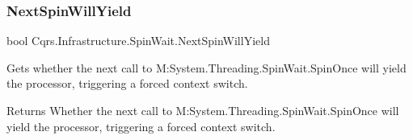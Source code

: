 \subsubsection{\texorpdfstring{Next\+Spin\+Will\+Yield}{NextSpinWillYield}}
{\footnotesize\ttfamily bool Cqrs.\+Infrastructure.\+Spin\+Wait.\+Next\+Spin\+Will\+Yield\hspace{0.3cm}{\ttfamily [get]}}



Gets whether the next call to M\+:\+System.\+Threading.\+Spin\+Wait.\+Spin\+Once will yield the processor, triggering a forced context switch. 

\begin{DoxyReturn}{Returns}
Whether the next call to M\+:\+System.\+Threading.\+Spin\+Wait.\+Spin\+Once will yield the processor, triggering a forced context switch. 
\end{DoxyReturn}
